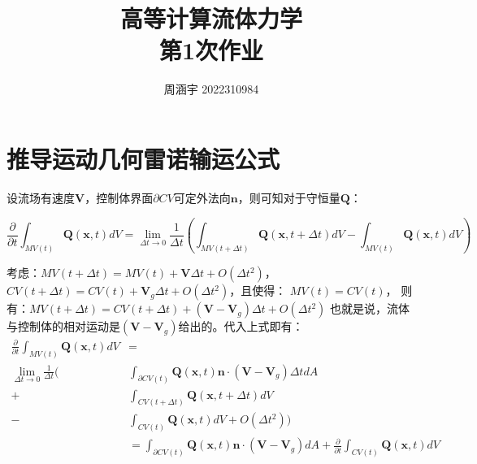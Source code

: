 \documentclass[UTF8,zihao=5]{ctexart} %
\title{{\bfseries\rmfamily\Huge{高等计算流体力学\hspace{1em}\\第1次作业}}}
\author{周涵宇 2022310984}
\date{}
\newcommand{\bm}[1]{{\mathbf{#1}}}
\newcommand*{\pd}[2]{\frac{\partial #1}{\partial #2}}
\newcommand*{\inc}[0]{{\Delta}}
\begin{document}
\maketitle



\section{推导运动几何雷诺输运公式}

\label{sec:1}

\newcommand*{\V}[0]{\bm{V}}
\newcommand*{\xx}[0]{\bm{x}}
\newcommand*{\Q}[0]{\bm{Q}}
\newcommand*{\nn}[0]{\bm{n}}


设流场有速度$\V$，控制体界面$\partial CV$可定外法向$\nn$，则可知对于守恒量$\Q$：

\begin{equation}
    \pd{}{t}\int_{MV(t)}{
        \Q(\xx,t) dV
    }
    =
    \lim_{\inc t \rightarrow 0}{
        \frac{1}{\inc t}\left(
        \int_{MV(t+\inc t)}{
            \Q(\xx,t+\inc t) dV
        }-
        \int_{MV(t)}{
            \Q(\xx,t) dV
        }
        \right)
    }
\end{equation}

考虑：$MV(t+\inc t)=MV(t)+\V\inc t+O(\inc t^2)$，
$CV(t+\inc t)=CV(t)+\V_g\inc t+O(\inc t^2)$，且使得：
$MV(t)=CV(t)$，
则有：$MV(t+\inc t)=CV(t+\inc t)+(\V-\V_g)\inc t + O(\inc t^2)$
也就是说，流体与控制体的相对运动是$(\V-\V_g)$给出的。代入上式即有：
\begin{equation}
    \begin{aligned}
        \pd{}{t}\int_{MV(t)}{
            \Q(\xx,t) dV
        }
         & =                      \\
        \lim_{\inc t \rightarrow 0}
        \frac{1}{\inc t}\biggl(
         & \int_{\partial CV(t)}{
            \Q(\xx,t) \nn \cdot (\V-\V_g)\inc t dA
        }                         \\+&
        \int_{CV(t+\inc t)}{
            \Q(\xx,t+\inc t) dV
        }                         \\-&
        \int_{CV(t)}{
            \Q(\xx,t) dV
        }
        +
        O(\inc t^2)
        \biggr)                   \\
         & =
        \int_{\partial CV(t)}{
            \Q(\xx,t) \nn \cdot (\V-\V_g) dA
        }
        +
        \pd{}{t}\int_{CV(t)}{
            \Q(\xx,t) dV
        }
    \end{aligned}
\end{equation}
\end{document}
